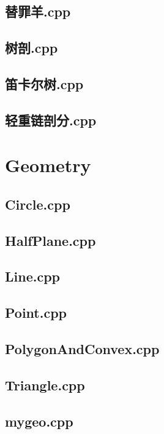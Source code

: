 \subsection{替罪羊.cpp}

\subsection{树剖.cpp}

\subsection{笛卡尔树.cpp}

\subsection{轻重链剖分.cpp}

\section{Geometry}
\subsection{Circle.cpp}

\subsection{HalfPlane.cpp}

\subsection{Line.cpp}

\subsection{Point.cpp}

\subsection{PolygonAndConvex.cpp}

\subsection{Triangle.cpp}

\subsection{mygeo.cpp}

